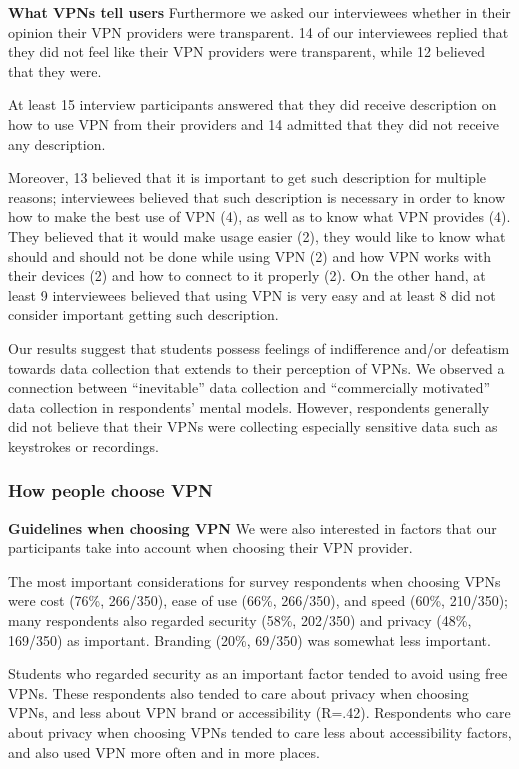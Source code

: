 \textbf{What VPNs tell users} Furthermore we asked our interviewees whether in
their opinion their VPN providers were transparent. 14 of our interviewees
replied that they did not feel like their VPN providers were transparent,
while 12 believed that they were. 

At least 15 interview participants answered that they did receive description
on how to use VPN from their providers and 14 admitted that they did not
receive any description.  

Moreover, 13 believed that it is important to get such description for
multiple reasons; interviewees believed that such description is necessary in
order to know how to make the best use of VPN (4), as well as to know what VPN
provides (4). They believed that it would make usage easier (2), they would
like to know what should and should not be done while using VPN (2) and how
VPN works with their devices (2) and how to connect to it properly (2). On the
other hand, at least 9 interviewees believed that using VPN is very easy and
at least 8 did not consider important getting such description. 

Our results suggest that students possess feelings of indifference and/or
defeatism towards data collection that extends to their perception of VPNs. We
observed a connection between “inevitable” data collection and “commercially
motivated” data collection in respondents’ mental models. However, respondents
generally did not believe that their VPNs were collecting especially sensitive
data such as keystrokes or recordings.



\subsubsection{How people choose VPN} \label{sec:findings-choosing}
\textbf{Guidelines when choosing VPN} We were also interested in factors that
our participants take into account when choosing their VPN provider.

The most important considerations for survey respondents when choosing VPNs
were cost (76\%, 266/350), ease of use (66\%, 266/350), and speed (60\%,
210/350); many respondents also regarded security (58\%, 202/350) and privacy
(48\%, 169/350) as important. Branding (20\%, 69/350) was somewhat less
important.

Students who regarded security as an important factor tended to avoid using
free VPNs. These respondents also tended to care about privacy when choosing
VPNs, and less about VPN brand or accessibility (R=.42). Respondents who care
about privacy when choosing VPNs tended to care less about accessibility
factors, and also used VPN more often and in more places.

